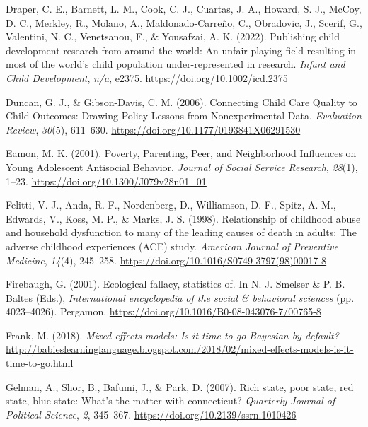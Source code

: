 \documentclass[
  letterpaper,
  DIV=11,
  numbers=noendperiod]{scrreprt}
\newlength{\cslhangindent}
\newlength{\cslentryspacingunit} %
\newenvironment{CSLReferences}[2] %
 {%
  \setlength{\parindent}{0pt}
  \ifodd #1
  \let\oldpar\par
  \def\par{\hangindent=\cslhangindent\oldpar}
  \fi
  \setlength{\parskip}{#2\cslentryspacingunit}
 }%
 {}
\begin{document}
\begin{CSLReferences}{1}{0}
\leavevmode{}%
Draper, C. E., Barnett, L. M., Cook, C. J., Cuartas, J. A., Howard, S.
J., McCoy, D. C., Merkley, R., Molano, A., Maldonado-Carreño, C.,
Obradovic, J., Scerif, G., Valentini, N. C., Venetsanou, F., \&
Yousafzai, A. K. (2022). Publishing child development research from
around the world: An unfair playing field resulting in most of the
world's child population under-represented in research. \emph{Infant and
Child Development}, \emph{n/a}, e2375.
\url{https://doi.org/10.1002/icd.2375}

\leavevmode{}%
Duncan, G. J., \& Gibson-Davis, C. M. (2006). {Connecting Child Care
Quality to Child Outcomes: Drawing Policy Lessons from Nonexperimental
Data}. \emph{Evaluation Review}, \emph{30}(5), 611--630.
\url{https://doi.org/10.1177/0193841X06291530}

\leavevmode{}%
Eamon, M. K. (2001). {Poverty, Parenting, Peer, and Neighborhood
Influences on Young Adolescent Antisocial Behavior}. \emph{Journal of
Social Service Research}, \emph{28}(1), 1--23.
\url{https://doi.org/10.1300/J079v28n01_01}

\leavevmode{}%
Felitti, V. J., Anda, R. F., Nordenberg, D., Williamson, D. F., Spitz,
A. M., Edwards, V., Koss, M. P., \& Marks, J. S. (1998). Relationship of
childhood abuse and household dysfunction to many of the leading causes
of death in adults: The adverse childhood experiences (ACE) study.
\emph{American Journal of Preventive Medicine}, \emph{14}(4), 245--258.
\url{https://doi.org/10.1016/S0749-3797(98)00017-8}

\leavevmode{}%
Firebaugh, G. (2001). Ecological fallacy, statistics of. In N. J.
Smelser \& P. B. Baltes (Eds.), \emph{International encyclopedia of the
social \& behavioral sciences} (pp. 4023--4026). Pergamon.
\url{https://doi.org/10.1016/B0-08-043076-7/00765-8}

\leavevmode{}%
Frank, M. (2018). \emph{Mixed effects models: Is it time to go
{B}ayesian by default?}
\url{http://babieslearninglanguage.blogspot.com/2018/02/mixed-effects-models-is-it-time-to-go.html}

\leavevmode{}%
Gelman, A., Shor, B., Bafumi, J., \& Park, D. (2007). Rich state, poor
state, red state, blue state: What's the matter with connecticut?
\emph{Quarterly Journal of Political Science}, \emph{2}, 345--367.
\url{https://doi.org/10.2139/ssrn.1010426}


\end{CSLReferences}
\end{document}
